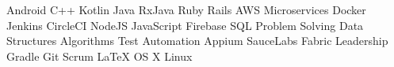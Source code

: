 
\begin{cvparagraph}

Android{\dotsep}
C++{\dotsep}
Kotlin{\dotsep}
Java{\dotsep}
RxJava{\dotsep}
Ruby{\dotsep}
Rails{\dotsep}
AWS{\dotsep}
Microservices{\dotsep}
Docker{\dotsep}
Jenkins{\dotsep}
CircleCI{\dotsep}
NodeJS{\dotsep}
JavaScript{\dotsep}
Firebase{\dotsep}
SQL{\dotsep}
Problem Solving{\dotsep}
Data Structures{\dotsep}
Algorithms{\dotsep}
Test Automation{\dotsep}
Appium{\dotsep}
SauceLabs{\dotsep}
Fabric{\dotsep}
Leadership{\dotsep}
Gradle{\dotsep}
Git{\dotsep}
Scrum{\dotsep}
\LaTeX{\dotsep}
OS X{\dotsep}
Linux

\end{cvparagraph}
